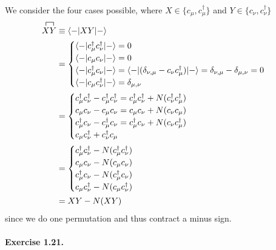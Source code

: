 \documentclass[12pt]{article}
\newcommand{\la}{\langle}
\newcommand{\ra}{\rangle}
\newcommand{\eq}[1]{{\begin{align*}#1\end{align*}}}
\newcommand{\da}{\dagger}
\begin{document}
\begin{tcolorbox}[title = Exercise 1.20. // Solution]
We consider the four cases possible, 
where $X \in \{c_{\mu},c^\da_{\mu}\}$ and
$Y \in \{c_{\nu},c^\da_{\nu}\}$
\eq{
\contraction{}{X}{}{Y}
XY
&\equiv
\la - | XY | - \ra\\
&=
\begin{cases}
    \la - | c_{\mu}^\da c_{\nu}^\da | - \ra = 0\\
    \la - | c_{\mu} c_{\nu} | - \ra = 0\\
    \la - | c_{\mu}^\da c_{\nu} | - \ra 
    = \la - | (\delta_{\nu,\mu} - c_{\nu} c_{\mu}^\da) | - \ra 
    = \delta_{\nu,\mu} - \delta_{\mu,\nu}= 0\\
    \la - | c_{\mu} c_{\nu}^\da | - \ra = \delta_{\mu,\nu}
\end{cases}\\
&=
\begin{cases}
    c_{\mu}^\da c_{\nu}^\da - c_{\mu}^\da c_{\nu}^\da
    = c_{\mu}^\da c_{\nu}^\da + N(c_{\nu}^\da c_{\mu}^\da)\\
    c_{\mu}c_{\nu} - c_{\mu}c_{\nu}
    = c_{\mu}c_{\nu} + N(c_{\nu}c_{\mu})\\
    c_{\mu}^\da c_{\nu} - c_{\mu}^\da c_{\nu}
    = c_{\mu}^\da c_{\nu} + N(c_{\nu}c_{\mu}^\da)\\
    c_{\mu}c_{\nu}^\da + c_{\nu}^\da c_{\mu}
\end{cases}\\
&=
\begin{cases}
        c_{\mu}^\da c_{\nu}^\da -N(c_{\mu}^\da c_{\nu}^\da)\\
        c_{\mu}c_{\nu} - N(c_{\mu}c_{\nu})\\ 
        c_{\mu}^\da c_{\nu} - N(c_{\mu}^\da c_{\nu})\\
        c_{\mu}c_{\nu}^\da - N(c_{\mu}c_{\nu}^\da)
\end{cases}\\
&= XY-N(XY)
}
since we do one permutation and thus contract a minus sign.
\end{tcolorbox}

\newpage
\paragraph{Exercise 1.21.}
\label{par:ex1.21}
\end{document}
